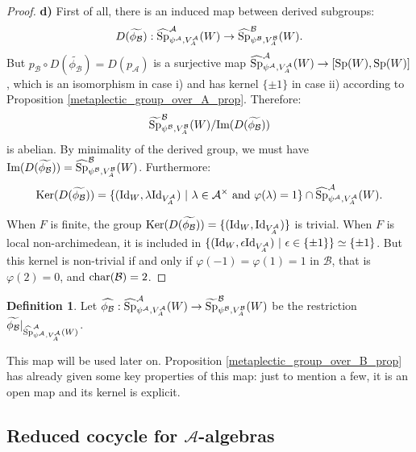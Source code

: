 \documentclass[11pt]{article}
\theoremstyle{plain}
\theoremstyle{definition}
\newtheorem{defi}[theo]{Definition}
\theoremstyle{plain}
\theoremstyle{definition}
\theoremstyle{plain}
\begin{document}
\begin{proof}
\noindent \textbf{d)} First of all, there is an induced map between derived subgroups:
$$D(\widetilde{\phi_\mathcal{B}}) : \widehat{\textup{Sp}}_{\psi^\mathcal{A},V_A^\mathcal{A}}^\mathcal{A}(W) \to \widehat{\textup{Sp}}_{\psi^\mathcal{B},V_A^\mathcal{B}}^\mathcal{B}(W).$$
But $p_\mathcal{B} \circ D(\widetilde{\phi_\mathcal{B}}) = D(p_\mathcal{A})$ is a surjective map $\widehat{\textup{Sp}}_{\psi^\mathcal{A},V_A^\mathcal{A}}^\mathcal{A}(W) \to [\textup{Sp}(W),\textup{Sp}(W)]$, which is an isomorphism in case i) and has kernel $\{ \pm 1 \}$ in case ii) according to Proposition \ref{metaplectic_group_over_A_prop}. Therefore:
$$\widetilde{\textup{Sp}}_{\psi^\mathcal{B},V_A^\mathcal{B}}^\mathcal{B}(W) / \textup{Im}(D(\widetilde{\phi_\mathcal{B}}))$$
is abelian. By minimality of the derived group, we must have $\textup{Im}(D(\widetilde{\phi_\mathcal{B}})) = \widehat{\textup{Sp}}_{\psi^\mathcal{B},V_A^\mathcal{B}}^\mathcal{B}(W)$. Furthermore:
$$\textup{Ker}(D(\widetilde{\phi_\mathcal{B}})) = \{ (\textup{Id}_W,\lambda \textup{Id}_{V_A^\mathcal{A}}) \ | \ \lambda \in \mathcal{A}^\times \textup{ and } \varphi(\lambda) = 1 \} \cap \widehat{\textup{Sp}}_{\psi^\mathcal{A},V_A^\mathcal{A}}^\mathcal{A}(W).$$

When $F$ is finite, the group $\textup{Ker}(D(\widetilde{\phi_\mathcal{B}}))= \{ (\textup{Id}_W,\textup{Id}_{V_A^\mathcal{A}}) \}$ is trivial. When $F$ is local non-archimedean, it is included in $\{ (\textup{Id}_W,\epsilon \textup{Id}_{V_A^\mathcal{A}}) \ | \ \epsilon \in \{ \pm 1 \} \} \simeq \{ \pm 1 \}$. But this kernel is non-trivial if and only if $\varphi(-1)=\varphi(1)=1$ in $\mathcal{B}$, that is $\varphi(2)=0$, and $\textup{char}(\mathcal{B}) = 2$. \end{proof}

\begin{defi} \label{reduced_met_group_hatA_to_tildeB_def} Let $\widehat{\phi_\mathcal{B}} : \widehat{\textup{Sp}}_{\psi^\mathcal{A},V_A^\mathcal{A}}^\mathcal{A}(W) \to \widetilde{\textup{Sp}}_{\psi^\mathcal{B},V_A^\mathcal{B}}^\mathcal{B}(W)$ be the restriction $\widetilde{\phi_\mathcal{B}}|_{\widehat{\textup{Sp}}_{\psi^\mathcal{A},V_A^\mathcal{A}}^\mathcal{A}(W)}$. \end{defi}

This map will be used later on. Proposition \ref{metaplectic_group_over_B_prop} has already given some key properties of this map: just to mention a few, it is an open map and its kernel is explicit.

\subsection{Reduced cocycle for $\mathcal{A}$-algebras} \label{reduced_cocycle_over_B_section}
\end{document}
